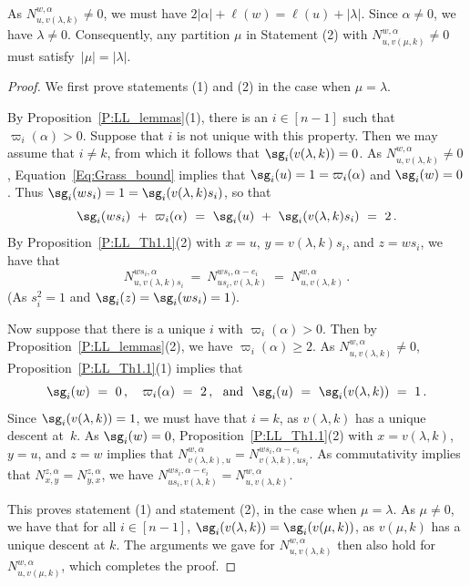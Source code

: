 As $N^{w,\alpha}_{u,v(\lambda,k)}\neq 0$, we must have $2|\alpha|+\ell(w)=\ell(u)+|\lambda|$.
Since $\alpha\neq 0$, we have $\lambda\neq 0$.
   Consequently, any partition $\mu$ in Statement (2) with $N^{w,\alpha}_{u,v(\mu,k)}\neq 0$ must satisfy~$|\mu|=|\lambda|$.

 \begin{proof}
   We first prove statements (1) and (2) in the case when $\mu=\lambda$.
   
   
   By Proposition~\ref{P:LL_lemmas}(1), there is an $i\in[n{-}1]$ such that $\varpi_i(\alpha)>0$.
   Suppose that $i$ is not unique with this property.
   Then we may assume that $i\neq k$, from which it follows that $\sg_i(v(\lambda, k)) = 0$.
   As $N^{w,\alpha}_{u,v(\lambda,k)}\neq 0$, Equation~\eqref{Eq:Grass_bound} implies that $\sg_i(u)=1=\varpi_i(\alpha)$ and $\sg_i(w)=0$.
   Thus $\sg_i(ws_i)=1=\sg_i(v(\lambda,k)s_i)$, so that
   \[
     \sg_i(ws_i)\ +\ \varpi_i(\alpha)\ =\ \sg_i(u)\ +\ \sg_i(v(\lambda,k) s_i)\ =\ 2\,.
   \]
   By Proposition~\ref{P:LL_Th1.1}(2) with $x=u$, $y=v(\lambda,k) s_i$, and $z=w s_i$, we have that 
   \[
     N^{ ws_i,\alpha}_{u, v(\lambda,k) s_i}\ =\ N^{ws_i, \alpha-e_i}_{u s_i, v(\lambda,k)}\ =\ N^{w,\alpha}_{u,v(\lambda,k)}\,.
   \]
   (As $s_i^2=1$ and $\sg_i(z)=\sg_i(ws_i)=1$).
   
   Now suppose that there is a unique $i$ with $\varpi_i(\alpha)>0$.
   Then by Proposition~\ref{P:LL_lemmas}(2), we have $\varpi_i(\alpha)\geq 2$.
   As $N^{w,\alpha}_{u,v(\lambda,k)}\neq  0$,  Proposition~\ref{P:LL_Th1.1}(1) implies that 
   \[
     \sg_i(w)\ =\ 0\,,\ \ \ 
     \varpi_i(\alpha)\ =\ 2\,,\ \ \mbox{and}\ \
     \sg_i(u)\ =\ \sg_i(v(\lambda,k))\ = \ 1\,.
   \]
   Since $\sg_i(v(\lambda,k))=1$, we must have that $i=k$, as $v(\lambda,k)$ has a unique descent at~$k$.
   As $\sg_i(w)=0$,  Proposition~\ref{P:LL_Th1.1}(2) with $x=v(\lambda,k)$, $y=u$, and $z=w$ implies that
   $N^{w,\alpha}_{v(\lambda,k), u}=N^{w s_i, \alpha-e_i}_{v(\lambda,k), u s_i}$.
   As commutativity implies that $N^{z,\alpha}_{x,y}=N^{z,\alpha}_{y,x}$, we have
   $N^{ws_i, \alpha-e_i}_{u s_i,v(\lambda,k)}=N^{w,\alpha}_{u,v(\lambda,k)}$.

   This proves statement (1) and statement (2), in the case when $\mu=\lambda$.
   As $\mu\neq 0$, we have that for all $i\in[n{-}1]$, $\sg_i(v(\lambda,k))=\sg_i(v(\mu,k))$, as
   $v(\mu,k)$ has a unique descent at $k$.
   The arguments we gave for $N^{w,\alpha}_{u,v(\lambda,k)}$ then also hold for $N^{w,\alpha}_{u,v(\mu,k)}$, which completes the proof.
 \end{proof}

